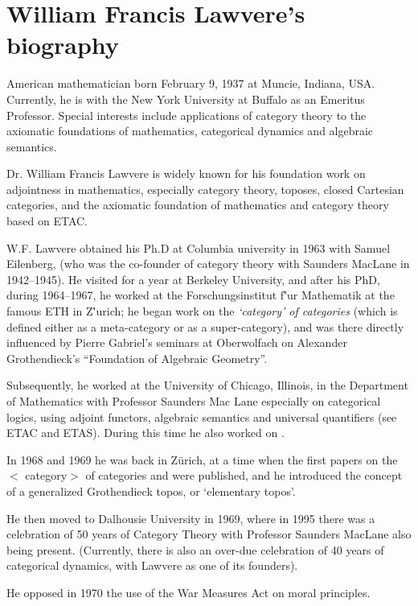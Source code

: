\documentclass[12pt]{article}
\theoremstyle{plain}
\theoremstyle{definition}
\numberwithin{equation}{section}
\begin{document}
\section{William Francis Lawvere's biography}

 American mathematician born February 9, 1937 at Muncie, Indiana, USA. Currently, he is with the New York University at Buffalo as an Emeritus Professor. Special interests include applications of category theory to the axiomatic foundations
of mathematics, categorical dynamics and algebraic semantics.

 Dr. William Francis Lawvere is widely known for his foundation work on adjointness in mathematics, especially category theory, toposes, closed Cartesian categories, and the axiomatic foundation of mathematics and category theory based on ETAC.

 W.F. Lawvere obtained his Ph.D at Columbia university in 1963 with Samuel Eilenberg, (who was the co-founder of category theory with Saunders MacLane in 1942--1945). He visited for a year at Berkeley University, and after his PhD, during 1964--1967, he worked at the Forschungsinstitut f\''ur Mathematik at the famous ETH in Z\''urich; he began work on the \emph{`category' of categories} (which is defined either as a meta-category or as a super-category), and was there directly influenced by Pierre Gabriel's seminars at Oberwolfach on Alexander Grothendieck's ``Foundation of Algebraic Geometry''.
 
 Subsequently, he worked at the University of Chicago, Illinois, in the Department of Mathematics with Professor Saunders Mac Lane especially on categorical logics, using adjoint functors, algebraic semantics and universal quantifiers (see ETAC and ETAS). During this time he also worked on . 

 In 1968 and 1969 he was back in Z\"urich, at a time when the first papers on the $<$ category$>$ of categories and 
 were published, and he introduced the concept of a generalized Grothendieck topos, or `elementary topos'.

 He then moved to Dalhousie University in 1969, where in 1995 there was a celebration of 50 years of Category Theory with Professor Saunders MacLane also being present. (Currently, there is also an over-due celebration of 40 years of categorical dynamics, with Lawvere as one of its founders). 

He opposed in 1970 the use of the War Measures Act on moral principles.
\end{document}
